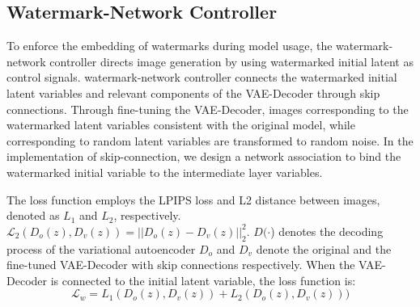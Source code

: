 

\subsection{Watermark-Network Controller}
To enforce the embedding of watermarks during model usage, the watermark-network controller directs image generation by using watermarked initial latent as control signals. watermark-network controller connects the watermarked initial latent variables and relevant components of the VAE-Decoder through skip connections. Through fine-tuning the VAE-Decoder, images corresponding to the watermarked latent variables consistent with the original model, while corresponding to random latent variables are transformed to random noise. In the implementation of skip-connection, we design a network association to bind the watermarked initial variable to the intermediate layer variables.

The loss function employs the LPIPS loss and L2 distance between images, denoted as $L_1$ and $L_2$, respectively. $\mathcal{L}_2(D_o(z),D_v(z))=||D_o(z)-D_v(z)||_2^2.$ $D(\cdot$) denotes the decoding process of the variational autoencoder $D_o$ and $D_v$ denote the original and the fine-tuned VAE-Decoder with skip connections respectively. When the VAE-Decoder is connected to the initial latent variable, the loss function is:
\begin{equation}
\mathcal{L}_w=L_1(D_o(z),D_v(z))+  L_2(D_o(z),D_v(z)))
\end{equation}

